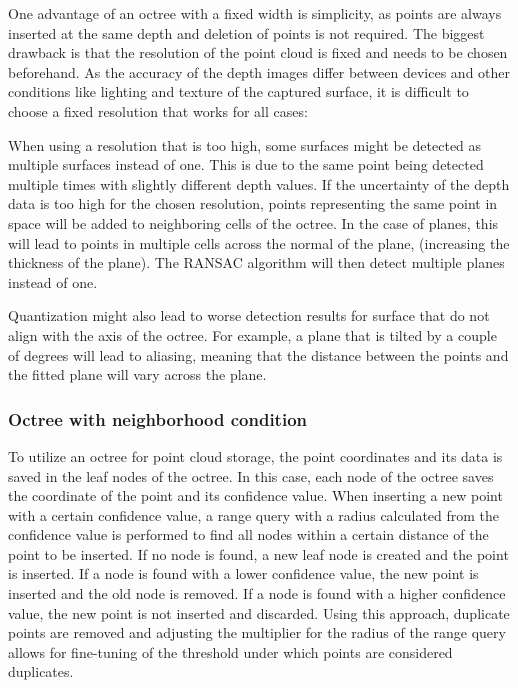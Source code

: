 One advantage of an octree with a fixed width is simplicity, as points are always inserted at the same depth and deletion of points is not required.
The biggest drawback is that the resolution of the point cloud is fixed and needs to be chosen beforehand.
As the accuracy of the depth images differ between devices and other conditions like lighting and texture of the captured surface,
it is difficult to choose a fixed resolution that works for all cases:

When using a resolution that is too high, some surfaces might be detected as multiple surfaces instead of one.
This is due to the same point being detected multiple times with slightly different depth values.
If the uncertainty of the depth data is too high for the chosen resolution,
points representing the same point in space will be added to neighboring cells of the octree.
In the case of planes, this will lead to points in multiple cells across the normal of the plane,
(increasing the thickness of the plane).
The RANSAC algorithm will then detect multiple planes instead of one.

Quantization might also lead to worse detection results for surface that do not align with the axis of the octree.
For example, a plane that is tilted by a couple of degrees will lead to aliasing,
meaning that the distance between the points and the fitted plane will vary across the plane.

\subsubsection{Octree with neighborhood condition}
To utilize an octree for point cloud storage, the point coordinates and its data is saved in the leaf nodes of the octree.
In this case, each node of the octree saves the coordinate of the point and its confidence value.
When inserting a new point with a certain confidence value, a range query with a radius calculated from the confidence value
is performed to find all nodes within a certain distance of the point to be inserted.
If no node is found, a new leaf node is created and the point is inserted.
If a node is found with a lower confidence value, the new point is inserted and the old node is removed.
If a node is found with a higher confidence value, the new point is not inserted and discarded.
Using this approach, duplicate points are removed and adjusting the multiplier for the radius of the range query
allows for fine-tuning of the threshold under which points are considered duplicates.

